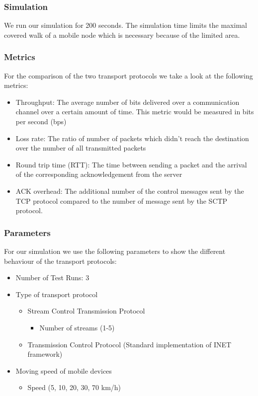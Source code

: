 \documentclass[a4paper]{article}
\begin{document}
\subsubsection{Simulation}
We run our simulation for 200 seconds. The simulation time limits the maximal covered walk of a mobile node which is necessary because of the limited area.
\subsubsection{Metrics}
For the comparison of the two transport protocols we take a look at the following metrics:
\begin{itemize}
	\item Throughput: The average number of bits delivered over a communication channel over a certain amount of time. This metric would be measured in bits per second (bps)
	\item Loss rate: The ratio of number of packets which didn’t reach the destination over the number of all transmitted packets
	\item Round trip time (RTT): The time between sending a packet and the arrival of the corresponding acknowledgement from the server
	\item ACK overhead: The additional number of the control messages sent by the TCP protocol compared to the number of message sent by the SCTP protocol.
\end{itemize}			
\subsubsection{Parameters}
For our simulation we use the following parameters to show the different behaviour of the transport protocols:
\begin{itemize}
	\item Number of Test Runs: 3
	\item Type of transport protocol
	\begin{itemize}
		\item Stream Control Transmission Protocol
		\begin{itemize}
			\item Number of streams (1-5)
		\end{itemize}
    	\item Transmission Control Protocol (Standard implementation of INET framework)
	\end{itemize}
	\item Moving speed of mobile devices
	\begin{itemize}
		\item Speed (5, 10, 20, 30, 70 km/h)
	\end{itemize}
\end{itemize}	
\end{document}
